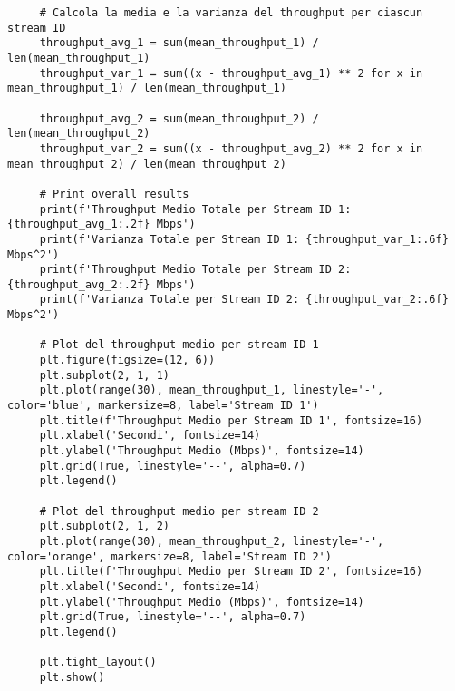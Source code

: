 \begin{lstlisting}
     # Calcola la media e la varianza del throughput per ciascun stream ID
     throughput_avg_1 = sum(mean_throughput_1) / len(mean_throughput_1)
     throughput_var_1 = sum((x - throughput_avg_1) ** 2 for x in mean_throughput_1) / len(mean_throughput_1)
     
     throughput_avg_2 = sum(mean_throughput_2) / len(mean_throughput_2)
     throughput_var_2 = sum((x - throughput_avg_2) ** 2 for x in mean_throughput_2) / len(mean_throughput_2)
     
     # Print overall results
     print(f'Throughput Medio Totale per Stream ID 1: {throughput_avg_1:.2f} Mbps')
     print(f'Varianza Totale per Stream ID 1: {throughput_var_1:.6f} Mbps^2')
     print(f'Throughput Medio Totale per Stream ID 2: {throughput_avg_2:.2f} Mbps')
     print(f'Varianza Totale per Stream ID 2: {throughput_var_2:.6f} Mbps^2')
     
     # Plot del throughput medio per stream ID 1
     plt.figure(figsize=(12, 6))
     plt.subplot(2, 1, 1)
     plt.plot(range(30), mean_throughput_1, linestyle='-', color='blue', markersize=8, label='Stream ID 1')
     plt.title(f'Throughput Medio per Stream ID 1', fontsize=16)
     plt.xlabel('Secondi', fontsize=14)
     plt.ylabel('Throughput Medio (Mbps)', fontsize=14)
     plt.grid(True, linestyle='--', alpha=0.7)
     plt.legend()
     
     # Plot del throughput medio per stream ID 2
     plt.subplot(2, 1, 2)
     plt.plot(range(30), mean_throughput_2, linestyle='-', color='orange', markersize=8, label='Stream ID 2')
     plt.title(f'Throughput Medio per Stream ID 2', fontsize=16)
     plt.xlabel('Secondi', fontsize=14)
     plt.ylabel('Throughput Medio (Mbps)', fontsize=14)
     plt.grid(True, linestyle='--', alpha=0.7)
     plt.legend()
     
     plt.tight_layout()
     plt.show()     
\end{lstlisting}

